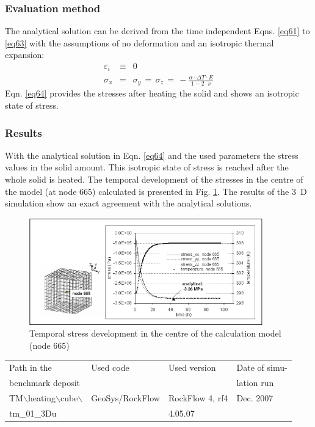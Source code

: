 
\subsubsection{Evaluation method}

The analytical solution can be derived from the time independent Eqns. \ref{eq61} to \ref{eq63} with the assumptions of no deformation and an isotropic thermal expansion:
\begin{eqnarray}
\varepsilon_i & \equiv & 0 \nonumber \\[1.5ex]
\sigma_x & = & \sigma_y\,=\,\sigma_z\,=\,
-\frac{\alpha\cdot\Delta T\cdot E}{1-2\cdot\nu}
\label{eq64}
\end{eqnarray}
Eqn. \ref{eq64} provides the stresses after heating the solid and shows an isotropic state of stress.

\subsubsection{Results}

With the analytical solution in Eqn. \ref{eq64} and the used parameters the stress values in the solid amount. This isotropic state of stress is reached after the whole solid is heated. The temporal development of the stresses in the centre of the model (at node 665) calculated is presented in Fig. \ref{fig63}. The results of the 3~D simulation show an exact agreement with the analytical solutions.

\begin{figure}[htbp]
\centering
\includegraphics[width=0.9\textwidth]{TM/figures/fig63.eps}
\caption{Temporal stress development in the centre of the calculation model (node 665)}
\label{fig63}
\end{figure}

\begin{tabular}{|l|l|l|l|}
\hline
Path in the & Used code	& Used version & Date of simu- \\
benchmark deposit	& & & lation run \\
\hline	
TM$\backslash$heating$\backslash$cube$\backslash$	& GeoSys/RockFlow	& RockFlow 4,	rf4 & Dec. 2007 \\
tm\_01\_3Du	& & 4.05.07 & \\
\hline	
\end{tabular}
